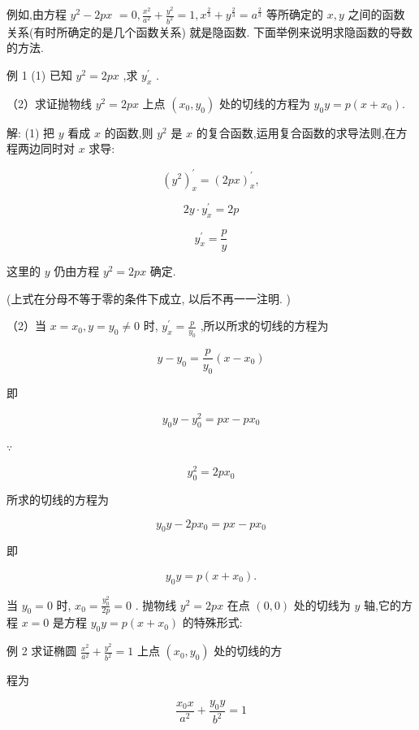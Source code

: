 \documentclass[lang=cn,newtx,10pt,scheme=chinese]{elegantbook}
\begin{document}
例如,由方程 \({y}^{2} - {2px}\) \(= 0,\frac{{x}^{2}}{{a}^{2}} + \frac{{y}^{2}}{{b}^{2}} = 1,{x}^{\frac{2}{3}} + {y}^{\frac{2}{3}} = {a}^{\frac{2}{3}}\) 等所确定的 \(x,y\) 之间的函数关系(有时所确定的是几个函数关系) 就是隐函数. 下面举例来说明求隐函数的导数的方法.

例 1 (1) 已知 \({y}^{2} = {2px}\) ,求 \({y}_{x}^{\prime }\) .

（2）求证抛物线 \({y}^{2} = {2px}\) 上点 \(\left( {{x}_{0},{y}_{0}}\right)\) 处的切线的方程为 \({y}_{0}y = p\left( {x + {x}_{0}}\right) .\)

解: (1) 把 \(y\) 看成 \(x\) 的函数,则 \({y}^{2}\) 是 \(x\) 的复合函数,运用复合函数的求导法则,在方程两边同时对 \(x\) 求导:

\[
{\left( {y}^{2}\right) }_{x}^{\prime } = {\left( 2px\right) }_{x}^{\prime },
\]

\[
{2y} \cdot {y}_{x}^{\prime } = {2p}
\]

\[
{y}_{x}^{\prime } = \frac{p}{y}
\]

这里的 \(y\) 仍由方程 \({y}^{2} = {2px}\) 确定.

(上式在分母不等于零的条件下成立, 以后不再一一注明. )

（2）当 \(x = {x}_{0},y = {y}_{0} \neq 0\) 时, \({y}_{x}^{\prime } = \frac{p}{{y}_{0}}\) ,所以所求的切线的方程为

\[
y - {y}_{0} = \frac{p}{{y}_{0}}\left( {x - {x}_{0}}\right)
\]

即

\[
{y}_{0}y - {y}_{0}^{2} = {px} - p{x}_{0}
\]

\(\because\)

\[
{y}_{0}^{2} = {2p}{x}_{0}
\]

所求的切线的方程为

\[
{y}_{0}y - {2p}{x}_{0} = {px} - p{x}_{0}
\]

即

\[
{y}_{0}y = p\left( {x + {x}_{0}}\right) .
\]

当 \({y}_{0} = 0\) 时, \({x}_{0} = \frac{{y}_{0}^{2}}{2p} = 0\) . 抛物线 \({y}^{2} = {2px}\) 在点 \(\left( {0,0}\right)\) 处的切线为 \(y\) 轴,它的方程 \(x = 0\) 是方程 \({y}_{0}y = p\left( {x + {x}_{0}}\right)\) 的特殊形式:

例 2 求证椭圆 \(\frac{{x}^{2}}{{a}^{2}} + \frac{{y}^{2}}{{b}^{2}} = 1\) 上点 \(\left( {{x}_{0},{y}_{0}}\right)\) 处的切线的方

程为

\[
\frac{{x}_{0}x}{{a}^{2}} + \frac{{y}_{0}y}{{b}^{2}} = 1
\]
\end{document}

